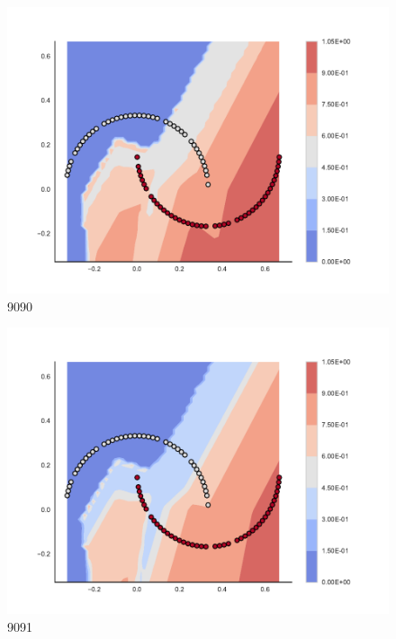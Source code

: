 \begin{subfigure}[b]{0.09\textwidth}
    \includegraphics[clip, trim=2.35cm 1.75cm 4.5cm 0cm,width=\textwidth]{img/convergence/9090.pdf}
    \caption{9090}
    \label{fig:convergence_9090}
\end{subfigure}
%
\begin{subfigure}[b]{0.09\textwidth}
    \includegraphics[clip, trim=2.35cm 1.75cm 4.5cm 0cm,width=\textwidth]{img/convergence/9091.pdf}
    \caption{9091}
    \label{fig:convergence_9091}
\end{subfigure}
%
